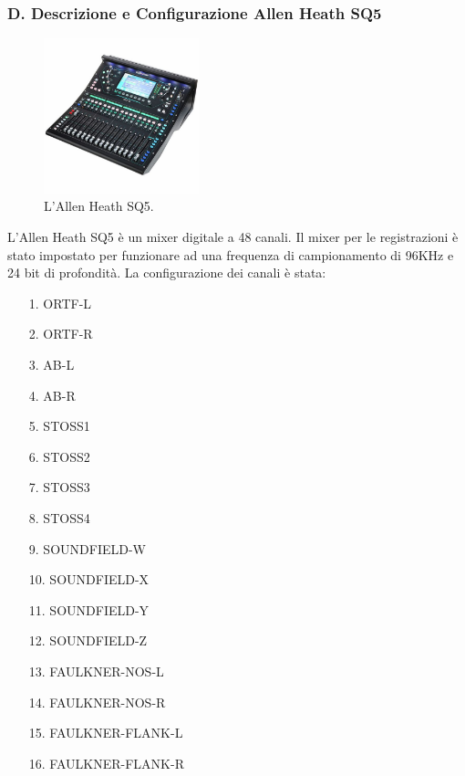 \documentclass{article}
\begin{document}
\subsubsection{D. Descrizione e Configurazione Allen Heath SQ5}
    \begin{figure}[H]
        \centering
        \includegraphics[width=0.4\textwidth]{images/SQ5.jpg}
        \caption{\label{fig7}L'Allen Heath SQ5.}
    \end{figure}
    
    L'Allen Heath SQ5 è un mixer digitale a 48 canali. Il mixer per le registrazioni è stato impostato per funzionare ad una frequenza di campionamento di 96KHz e 24 bit di profondità.
    La configurazione dei canali è stata:
    \begin{itemize}
        \item[1.] ORTF-L
        \item[2.] ORTF-R
        \item[3.] AB-L
        \item[4.] AB-R
        \item[5.] STOSS1
        \item[6.] STOSS2
        \item[7.] STOSS3
        \item[8.] STOSS4
        \item[9.] SOUNDFIELD-W
        \item[10.] SOUNDFIELD-X
        \item[11.] SOUNDFIELD-Y
        \item[12.] SOUNDFIELD-Z
        \item[13.] FAULKNER-NOS-L
        \item[14.] FAULKNER-NOS-R
        \item[15.] FAULKNER-FLANK-L
        \item[16.] FAULKNER-FLANK-R
    \end{itemize}
\endsubsubsection
\endsubsection
\end{document}
